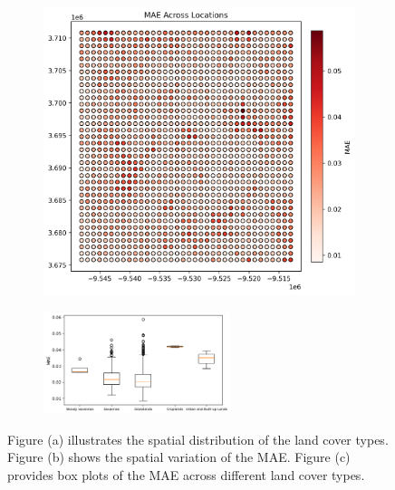 \documentclass[review]{elsarticle}
\begin{document}
\begin{figure}
\begin{subfigure}[b]{0.4\textwidth}
         \includegraphics[width=\textwidth]{figure/error_across_space}
		 \caption{}
	\label{fig: missing at random}
     \end{subfigure}
     
    \begin{subfigure}[b]{\textwidth}
    \centering
	\includegraphics[width=0.6\textwidth]{figure/error_across_land_cover}
	\caption{}
	\end{subfigure}
    
     \caption{Figure (a) illustrates the spatial distribution of the land cover types. Figure (b) shows the spatial variation of the MAE. Figure (c) provides box plots of the MAE across different land cover types.}
     \label{fig: mae_across_space}
\end{figure}

 
 
\end{document}
